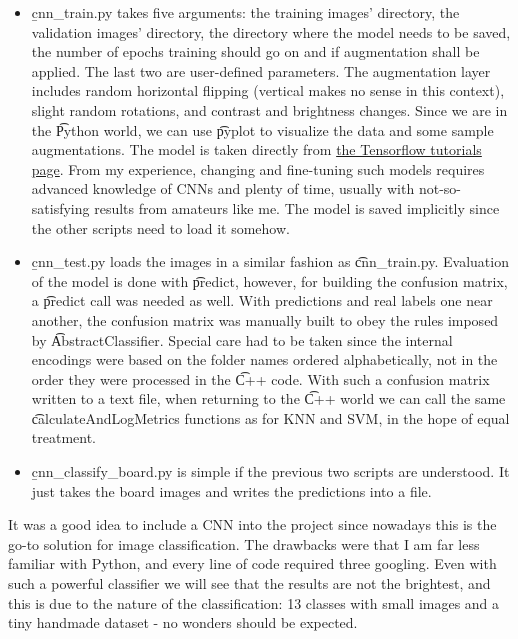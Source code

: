 \begin{itemize}
    \item \b{cnn\_train.py} takes five arguments: the training images' directory, the validation images' directory, the directory where the model needs to be saved, the number of epochs training should go on and if augmentation shall be applied. The last two are user-defined parameters. The augmentation layer includes random horizontal flipping (vertical makes no sense in this context), slight random rotations, and contrast and brightness changes. Since we are in the \t{Python} world, we can use \t{pyplot} to visualize the data and some sample augmentations. The model is taken directly from \href{https://www.tensorflow.org/tutorials/images/classification#a_basic_keras_model}{the Tensorflow tutorials page}. From my experience, changing and fine-tuning such models requires advanced knowledge of CNNs and plenty of time, usually with not-so-satisfying results from amateurs like me. The model is saved implicitly since the other scripts need to load it somehow.
    
    \item \b{cnn\_test.py} loads the images in a similar fashion as \t{cnn\_train.py}. Evaluation of the model is done with \t{predict}, however, for building the confusion matrix, a \t{predict} call was needed as well. With predictions and real labels one near another, the confusion matrix was manually built to obey the rules imposed by \t{AbstractClassifier}. Special care had to be taken since the internal encodings were based on the folder names ordered alphabetically, not in the order they were processed in the \t{C++} code. With such a confusion matrix written to a text file, when returning to the \t{C++} world we can call the same \t{calculateAndLogMetrics} functions as for KNN and SVM, in the hope of equal treatment.
    
    \item \b{cnn\_classify\_board.py} is simple if the previous two scripts are understood. It just takes the board images and writes the predictions into a file.
\end{itemize}

It was a good idea to include a CNN into the project since nowadays this is the go-to solution for image classification. The drawbacks were that I am far less familiar with Python, and every line of code required three googling. Even with such a powerful classifier we will see that the results are not the brightest, and this is due to the nature of the classification: 13 classes with small images and a tiny handmade dataset - no wonders should be expected.


